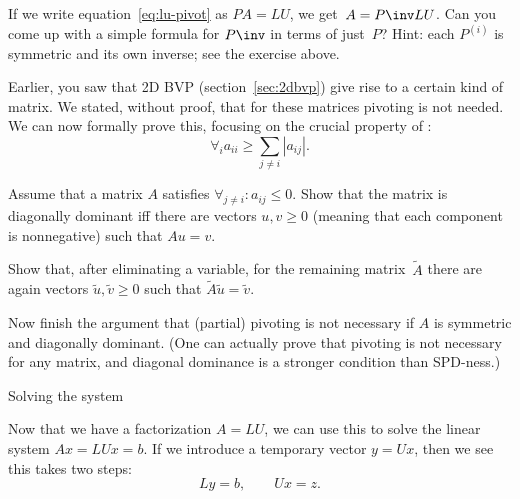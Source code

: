 \begin{exercise}
  If we write equation~\eqref{eq:lu-pivot} as $PA=LU$, we get~$A=P\inv
  LU$. Can you come up with a simple formula for $P\inv$ in terms of
  just~$P$? Hint: each $P^{(i)}$ is symmetric and its own inverse; see
  the exercise above.
\end{exercise}

\begin{exercise}
  Earlier, you saw that 2D \acs{BVP} (section~\ref{sec:2dbvp}) give
  rise to a certain kind of matrix. We stated, without proof, that for
  these matrices pivoting is not needed. We can now formally prove
  this, focusing on the crucial property of :
  \[ \forall_i a_{ii}\geq\sum_{j\not=i}|a_{ij}|. \]

  Assume that a matrix $A$ satisfies
  $\forall_{j\not=i}\colon a_{ij}\leq 0$. Show that the matrix is
  diagonally dominant iff there are vectors
  $u,v\geq0$ (meaning that each component is nonnegative) such that
  $Au=v$.

  Show that, after eliminating a variable, for the remaining
  matrix~$\tilde A$ there are again vectors $\tilde u,\tilde v\geq0$
  such that $\tilde A\tilde u=\tilde v$.

  Now finish the argument that (partial) pivoting is not necessary if
  $A$ is symmetric and diagonally dominant. (One can actually prove
  that pivoting is not necessary for any  matrix, and
  diagonal dominance is a stronger condition than \ac{SPD}-ness.)
\end{exercise}
\label{ex:no-pivot}


 {Solving the system}
\label{sec:lu-solve}

Now that we have a factorization $A=LU$, we can use this to solve the
linear system $Ax=LUx=b$. If we introduce a temporary vector $y=Ux$,
then we see this takes two steps:
\[ Ly=b,\qquad Ux=z. \]

